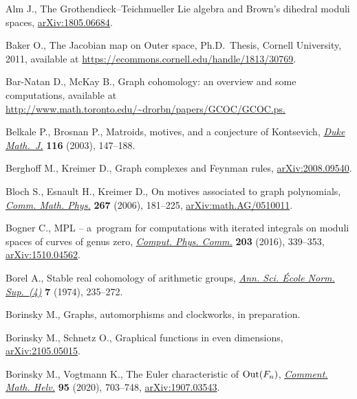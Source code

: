 \documentclass[pdftex]{sigma}%
\numberwithin{equation}{section}
\newcommand{\0}{\color{blue}{\mathsf{0}}}
\begin{document}
\begin{thebibliography}{99}
\footnotesize\itemsep=0pt

Alm J., The {G}rothendieck--{T}eichmueller {L}ie algebra and {B}rown's dihedral
 moduli spaces, \href{https://arxiv.org/abs/1805.06684}{arXiv:1805.06684}.

Baker O., The {J}acobian map on {O}uter space, Ph.D.~Thesis, {C}ornell
 University, 2011, available at
 \url{https://ecommons.cornell.edu/handle/1813/30769}.

Bar-Natan D., McKay B., Graph cohomology: an overview and some computations,
 available at \url{http://www.math.toronto.edu/~drorbn/papers/GCOC/GCOC.ps.}

Belkale P., Brosnan P., Matroids, motives, and a conjecture of {K}ontsevich,
 \href{https://doi.org/10.1215/S0012-7094-03-11615-4}{\textit{Duke Math.~J.}} \textbf{116} (2003), 147--188.

Berghoff M., Kreimer D., Graph complexes and {F}eynman rules,
 \href{https://arxiv.org/abs/2008.09540}{arXiv:2008.09540}.

Bloch S., Esnault H., Kreimer D., On motives associated to graph polynomials,
 \href{https://doi.org/10.1007/s00220-006-0040-2}{\textit{Comm. Math. Phys.}} \textbf{267} (2006), 181--225,
 \href{https://arxiv.org/abs/math.AG/0510011}{arXiv:math.AG/0510011}.

Bogner C., {MPL} -- a~program for computations with iterated integrals on
 moduli spaces of curves of genus zero, \href{https://doi.org/10.1016/j.cpc.2016.02.033}{\textit{Comput. Phys. Comm.}}
 \textbf{203} (2016), 339--353, \href{https://arxiv.org/abs/1510.04562}{arXiv:1510.04562}.

Borel A., Stable real cohomology of arithmetic groups, \href{https://doi.org/10.24033/asens.1269}{\textit{Ann. Sci.
 \'Ecole Norm. Sup.~(4)}} \textbf{7} (1974), 235--272.

Borinsky M., Graphs, automorphisms and clockworks, in preparation.

Borinsky M., Schnetz O., Graphical functions in even dimensions,
 \href{https://arxiv.org/abs/2105.05015}{arXiv:2105.05015}.

Borinsky M., Vogtmann K., The {E}uler characteristic of {${\rm Out}(F_n)$},
 \href{https://doi.org/10.4171/cmh/501}{\textit{Comment. Math. Helv.}} \textbf{95} (2020), 703--748,
 \href{https://arxiv.org/abs/1907.03543}{arXiv:1907.03543}.


\end{thebibliography}
\end{document}
